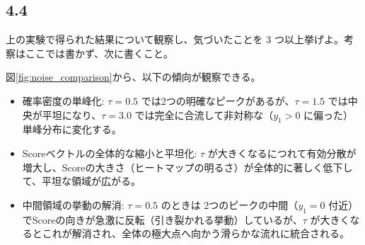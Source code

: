 \documentclass[11pt,a4paper,dvipdfmx]{article}
\numberwithin{equation}{section}
\newenvironment{proofbox}[0]
{
    \begin{mdframed}[
        linecolor=black,
        topline=false,
        bottomline=false,
        rightline=false,
        leftline=true,
        linewidth=2pt,
        innerleftmargin=10pt,
        skipabove=\baselineskip,
        skipbelow=\baselineskip,
    ]
}
{
    \end{mdframed}
}
\newenvironment{note}[0]
{
    \begin{tcolorbox}[sharp corners, colframe=gray!20, colback=gray!20, width=\textwidth]
}
{
    \end{tcolorbox}
}
\begin{document}
\subsection*{4.4}
\begin{note}
上の実験で得られた結果について観察し、気づいたことを 3 つ以上挙げよ。考察はここでは書かず、次に書くこと。
\\
\end{note}
\begin{proofbox}
図\ref{fig:noise_comparison}から、以下の傾向が観察できる。

\begin{itemize}
    \item 確率密度の単峰化: $\tau = 0.5$ では2つの明確なピークがあるが、$\tau = 1.5$ では中央が平坦になり、$\tau = 3.0$ では完全に合流して非対称な（$y_1 > 0$ に偏った）単峰分布に変化する。
    \item Scoreベクトルの全体的な縮小と平坦化: $\tau$ が大きくなるにつれて有効分散が増大し、Scoreの大きさ（ヒートマップの明るさ）が全体的に著しく低下して、平坦な領域が広がる。
    \item 中間領域の挙動の解消: $\tau = 0.5$ のときは 2つのピークの中間（$y_1 = 0$ 付近）でScoreの向きが急激に反転（引き裂かれる挙動）しているが、$\tau$ が大きくなるとこれが解消され、全体の極大点へ向かう滑らかな流れに統合される。
\end{itemize}
\end{proofbox}
\end{document}
